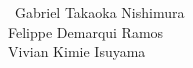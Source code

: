 \documentclass[
	12pt,				%
	openright,			%
	oneside,			%
	a4paper,			%
	hyphens,			%
	english,			%
	brazil				%
]{abntex2}
\begin{document}

	\frenchspacing


	\imprimircapa

	
	\begin{center}
		{\ABNTEXchapterfont\large\ Gabriel Takaoka Nishimura \\ Felippe Demarqui Ramos \\ \vspace*{0.18cm} Vivian Kimie Isuyama}
		
		\vspace*{\fill}\vspace*{\fill}
		\begin{center}
			\ABNTEXchapterfont\bfseries\Large\imprimirtitulo
		\end{center}
		\vspace*{\fill}
		
		{%
			\hspace{.45\textwidth}
			\begin{minipage}{.5\textwidth}
				\SingleSpacing
				\imprimirpreambulo
			\end{minipage}%
			\vspace*{\fill}
		}%
		
		{\imprimirinstituicao\vspace*{\fill}}
		
		{\large\imprimirorientadorRotulo~\imprimirorientador\par}

		\vspace*{\fill}
		
		{\large\imprimirlocal}
		\par
		{\large\imprimirdata}
		\vspace*{1cm}
		
	\end{center}


\end{document}
